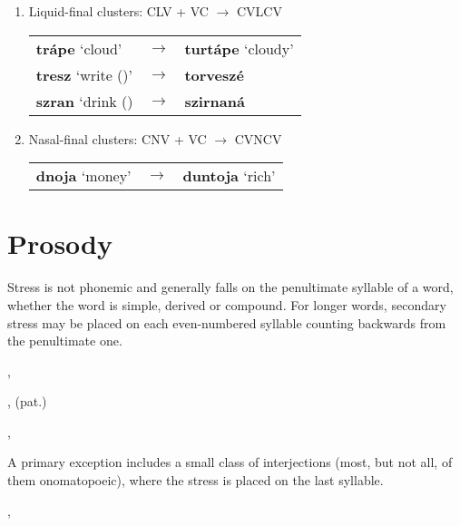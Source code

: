 \begin{enumerate}
	\item Liquid-final clusters: CLV + \glot VC $\rightarrow$ CVLCV
	\begin{center}
	\begin{tabu}to 0.8\textwidth{YM[0.1]Y}
		\textbf{trápe} `cloud'&$\rightarrow$&\textbf{turtápe} `cloudy'\\
		\textbf{tresz} `write ()'&$\rightarrow$&\textbf{torveszé}\\
		\textbf{szran} `drink () &$\rightarrow$&\textbf{szirnaná}\\
	\end{tabu}
	\end{center}

	\item Nasal-final clusters: CNV + \glot VC $\rightarrow$ CVNCV
	\begin{center}
		\begin{tabu}to 0.8\textwidth{YM[0.1]Y}
			\textbf{dnoja} `money'&$\rightarrow$&\textbf{duntoja} `rich'\\
		\end{tabu}
	\end{center}
\end{enumerate}

\section{Prosody}

Stress is not phonemic and generally falls on the penultimate syllable of a word, whether the word is simple, derived or compound. For longer words, secondary stress may be placed on each even-numbered syllable counting backwards from the penultimate one.

\pex
\a {}, \\

\a {},  (pat.)\\

\a {}, \\
\xe

A primary exception includes a small class of interjections (most, but not all, of them onomatopoeic), where the stress is placed on the last syllable.

\pex
\a {}, 

